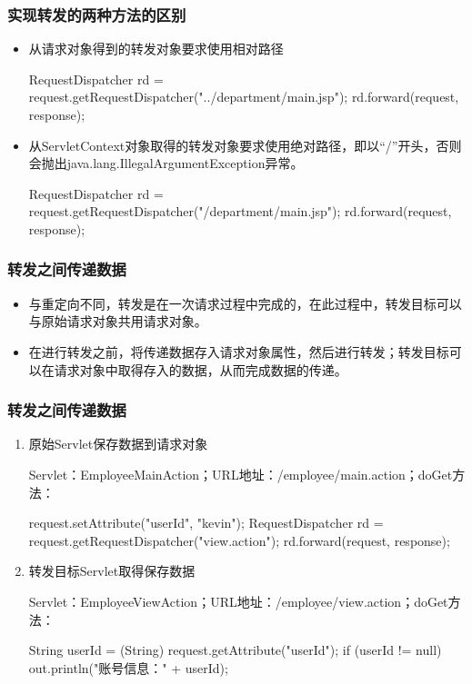\begin{frame}[fragile] %
\frametitle{实现转发的两种方法的区别}

\begin{itemize}
\item {\hei 从请求对象得到的转发对象要求使用相对路径}

\begin{javaCode}
RequestDispatcher rd = request.getRequestDispatcher("../department/main.jsp");
rd.forward(request, response);
\end{javaCode}

\item {\hei 从ServletContext对象取得的转发对象要求使用绝对路径}，即以“/”开头，否则会抛出java.lang.IllegalArgumentException异常。

\begin{javaCode}
RequestDispatcher rd = request.getRequestDispatcher("/department/main.jsp");
rd.forward(request, response);
\end{javaCode}
\end{itemize}
\end{frame}

\begin{frame}[fragile] %
\frametitle{转发之间传递数据} 
\begin{itemize}
\item 与重定向不同，转发是在一次请求过程中完成的，在此过程中，转发目标可以与原始请求对象共用请求对象。
\item 在进行转发之前，将传递数据存入请求对象属性，然后进行转发；转发目标可以在请求对象中取得存入的数据，从而完成数据的传递。
\end{itemize}
\end{frame}

\begin{frame}[fragile] %
\frametitle{转发之间传递数据} 

\begin{enumerate}
\item 原始Servlet保存数据到请求对象

Servlet：EmployeeMainAction；URL地址：/employee/main.action；doGet方法：

\begin{javaCode}
request.setAttribute("userId", "kevin");
RequestDispatcher rd = request.getRequestDispatcher("view.action");
rd.forward(request, response);
\end{javaCode}

\item 转发目标Servlet取得保存数据

Servlet：EmployeeViewAction；URL地址：/employee/view.action；doGet方法：

\begin{javaCode}
String userId = (String) request.getAttribute("userId");
if (userId != null) {
  out.println("账号信息：" + userId);
}
\end{javaCode}
\end{enumerate}
\end{frame}

